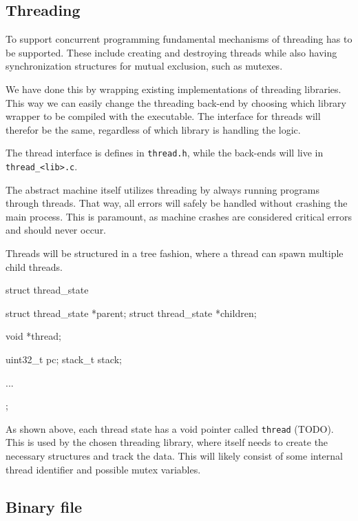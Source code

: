 \subsection{Threading}

To support concurrent programming fundamental mechanisms of threading has to be
supported. These include creating and destroying threads while also having
synchronization structures for mutual exclusion, such as mutexes.

We have done this by wrapping existing implementations of threading libraries.
This way we can easily change the threading back-end by choosing which library
wrapper to be compiled with the executable. The interface for threads will
therefor be the same, regardless of which library is handling the logic.

The thread interface is defines in {\tt thread.h}, while the back-ends will live
in {\tt thread\_<lib>.c}.

The abstract machine itself utilizes threading by always running programs
through threads. That way, all errors will safely be handled without crashing
the main process. This is paramount, as machine crashes are considered critical
errors and should never occur.

Threads will be structured in a tree fashion, where a thread can spawn multiple
child threads.
\begin{ccode}
struct thread_state {
    struct thread_state *parent;
    struct thread_state *children;

    void *thread;

    uint32_t pc;
    stack_t stack;

    ...
};
\end{ccode}

As shown above, each thread state has a void pointer called {\tt thread}
(TODO). This is used by the chosen threading library, where itself needs to
create the necessary structures and track the data. This will likely consist of
some internal thread identifier and possible mutex variables.


\subsection{Binary file}



